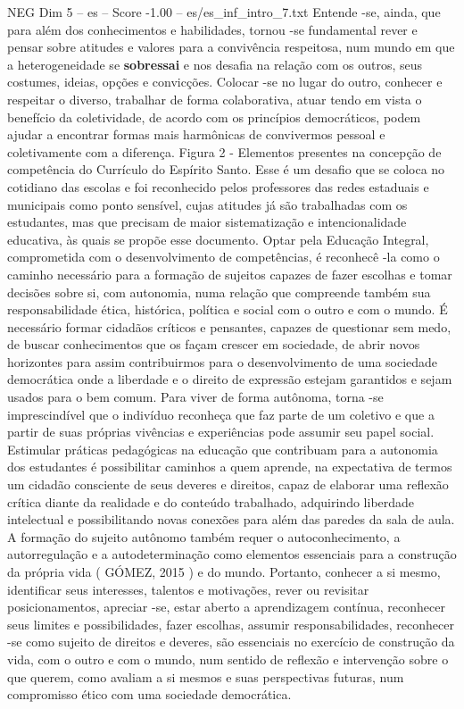 \begin{textsample}{NEG Dim 5 – es – Score -1.00 – es/es\_inf\_intro\_7.txt}  \label{ex:f5_neg_185}
Entende -se, ainda, que para além dos conhecimentos e habilidades, tornou -se fundamental rever e pensar sobre atitudes e valores para a convivência respeitosa, num mundo em que a heterogeneidade se \textbf{sobressai} e nos desafia na relação com os outros, seus costumes, ideias, opções e convicções.
Colocar -se no lugar do outro, conhecer e respeitar o diverso, trabalhar de forma colaborativa, atuar tendo em vista o benefício da coletividade, de acordo com os princípios democráticos, podem ajudar a encontrar formas mais harmônicas de convivermos pessoal e coletivamente com a diferença.
Figura 2 - Elementos presentes na concepção de competência do Currículo do Espírito Santo.
Esse é um desafio que se coloca no cotidiano das escolas e foi reconhecido pelos professores das redes estaduais e municipais como ponto sensível, cujas atitudes já são trabalhadas com os estudantes, mas que precisam de maior sistematização e intencionalidade educativa, às quais se propõe esse documento.
Optar pela Educação Integral, comprometida com o desenvolvimento de competências, é reconhecê -la como o caminho necessário para a formação de sujeitos capazes de fazer escolhas e tomar decisões sobre si, com autonomia, numa relação que compreende também sua responsabilidade ética, histórica, política e social com o outro e com o mundo.
É necessário formar cidadãos críticos e pensantes, capazes de questionar sem medo, de buscar conhecimentos que os façam crescer em sociedade, de abrir novos horizontes para assim contribuirmos para o desenvolvimento de uma sociedade democrática onde a liberdade e o direito de expressão estejam garantidos e sejam usados para o bem comum.
Para viver de forma autônoma, torna -se imprescindível que o indivíduo reconheça que faz parte de um coletivo e que a partir de suas próprias vivências e experiências pode assumir seu papel social.
Estimular práticas pedagógicas na educação que contribuam para a autonomia dos estudantes é possibilitar caminhos a quem aprende, na expectativa de termos um cidadão consciente de seus deveres e direitos, capaz de elaborar uma reflexão crítica diante da realidade e do conteúdo trabalhado, adquirindo liberdade intelectual e possibilitando novas conexões para além das paredes da sala de aula.
A formação do sujeito autônomo também requer o autoconhecimento, a autorregulação e a autodeterminação como elementos essenciais para a construção da própria vida ( GÓMEZ, 2015 ) e do mundo.
Portanto, conhecer a si mesmo, identificar seus interesses, talentos e motivações, rever ou revisitar posicionamentos, apreciar -se, estar aberto a aprendizagem contínua, reconhecer seus limites e possibilidades, fazer escolhas, assumir responsabilidades, reconhecer -se como sujeito de direitos e deveres, são essenciais no exercício de construção da vida, com o outro e com o mundo, num sentido de reflexão e intervenção sobre o que querem, como avaliam a si mesmos e suas perspectivas futuras, num compromisso ético com uma sociedade democrática.

\end{textsample}
